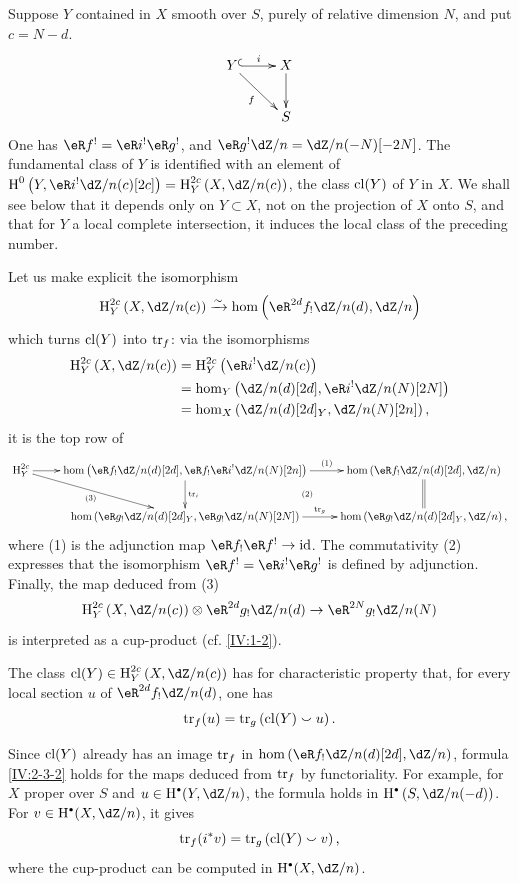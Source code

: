 Suppose $Y$ contained in $X$ smooth over $S$, purely of relative
dimension $N$, and put $c=N-d$.
\[\xymatrix{
  Y \ar@{^{(}->}[r]^-i \ar[dr]_-f
    & X \ar[d] \\
  & S
}\]
One has $\eR f^! = \eR i^!\eR g^!$, and $\eR g^! \dZ/n=\dZ/n(-N)[-2 N]$. The
fundamental class of $Y$ is identified with an element of
$\h^0\left(Y,\eR i^!\dZ/n(c)[2 c]\right)=\h_Y^{2 c}\left(X,\dZ/n(c)\right)$, the
class $\operatorname{cl}(Y)$ of $Y$ in $X$. We shall see below that it depends only
on $Y\subset X$, not on the projection of $X$ onto $S$, and that for $Y$
a local complete intersection, it induces the local class of the preceding
number.

Let us make explicit the isomorphism
\[
  \h_Y^{2 c}\left(X,\dZ/n(c)\right) \iso \hom\left(\eR^{2 d}f_!\dZ/n(d),\dZ/n\right)
\]
which turns $\operatorname{cl}(Y)$ into $\operatorname{tr}_f$: via the isomorphisms
\begin{align*}
  \h_Y^{2 c}\left(X,\dZ/n(c)\right)
    &= \h_Y^{2 c}\left(\eR i^!\dZ/n(c)\right) \\
    &= \hom_Y\left(\dZ/n(d)[2 d],\eR i^!\dZ/n(N)[2 N]\right) \\
    &= \hom_X\left(\dZ/n(d)[2 d]_Y,\dZ/n(N)[2 n]\right) \text{,}
\end{align*}
it is the top row of
\[\xymatrix{
  \h_Y^{2 c} \ar[r] \ar[dr]_-{(3)}
    & \hom\left(\eR f_!\dZ/n(d)[2 d],\eR f_! \eR i^!\dZ/n(N)[2 n]\right) \ar[r]^-{(1)} \ar[d]^-{\tr_i} \ar@{}[dr]|-{(2)}
    & \hom\left(\eR f_!\dZ/n(d)[2d],\dZ/n\right) \ar@{=}[d] \\
  & \hom\left(\eR g_!\dZ/n(d)[2 d]_Y,\eR g_!\dZ/n(N)[2 N]\right) \ar[r]^-{\tr_g}
    & \hom\left(\eR g_!\dZ/n(d)[2 d]_Y,\dZ/n\right) \text{,}
}\]
where (1) is the adjunction map $\eR f_!\eR f^!\to \text{id}$. The
commutativity (2) expresses that the isomorphism $\eR f^!=\eR i^!\eR g^!$ is
defined by adjunction. Finally, the map deduced from (3)
\[
  \h_Y^{2c}\left(X,\dZ/n(c)\right) \otimes \eR^{2 d} g_!\dZ/n(d) \to \eR^{2 N} g_!\dZ/n(N)
\]
is interpreted as a cup-product (cf. \ref{IV:1-2}).




\begin{definition}\label{IV:2-3-2}
The class $\cl(Y)\in\h_Y^{2 c}\left(X,\dZ/n(c)\right)$ has for characteristic
property that, for every local section $u$ of $\eR^{2 d}f_! \dZ/n(d)$,
one has
\[
  \operatorname{tr}_f(u) = \operatorname{tr}_g\left(\operatorname{cl}(Y)\smallsmile u\right) \text{.}
\]
\end{definition}

Since $\operatorname{cl}(Y)$ already has an image $\operatorname{tr}_f$ in
$\hom\left(\eR f_!\dZ/n(d)[2 d],\dZ/n\right)$, formula \ref{IV:2-3-2} holds
for the maps deduced from $\operatorname{tr}_f$ by functoriality. For example,
for $X$ proper over $S$ and $u\in \h^\bullet(Y,\dZ/n)$, the formula holds in
$\h^\bullet\left(S,\dZ/n(-d)\right)$. For $v\in \h^\bullet(X,\dZ/n)$, it
gives
\[
  \operatorname{tr}_f(i^* v) = \operatorname{tr}_g\left(\operatorname{cl}(Y)\smallsmile v\right) \text{,}
\]
where the cup-product can be computed in $\h^\bullet(X,\dZ/n)$.




